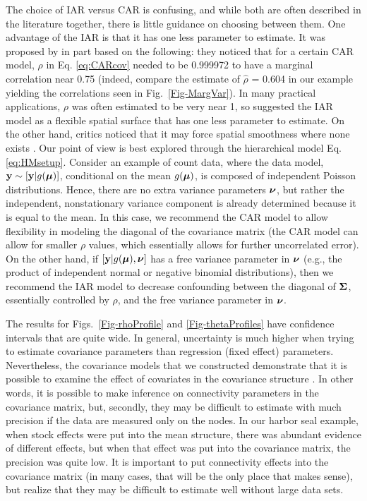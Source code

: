 \documentclass[11pt, titlepage]{article}\usepackage[]{graphicx}\usepackage[]{color}
\begin{document}
\begin{spacing}{1.9}
\begin{flushleft}
The choice of IAR versus CAR is confusing, and while both are often described in the literature together, there is little guidance on choosing between them.  One advantage of the IAR is that it has one less parameter to estimate.  It was proposed by \citet{Besa:Koop:cond:1995} in part based on the following: they noticed that for a certain CAR model, $\rho$ in Eq. \ref{eq:CARcov} needed to be 0.999972 to have a marginal correlation near 0.75 (indeed, compare the estimate of $\hat{\rho}$ = 0.604 in our example yielding the correlations seen in Fig.~\ref{Fig-MargVar}). In many practical applications, $\rho$ was often estimated to be very near 1, so \citet{Besa:Koop:cond:1995} suggested the IAR model as a flexible spatial surface that has one less parameter to estimate.  On the other hand, critics noticed that it may force spatial smoothness where none exists \citep[e.g.,][]{Lero:Lei:Bres:esti:2000}. Our point of view is best explored through the hierarchical model Eq. \ref{eq:HMsetup}.  Consider an example of count data, where the data model, $\mathbf{y} \sim [\mathbf{y}|g(\mbox{\boldmath $\mu$})]$, conditional on the mean $g(\mbox{\boldmath $\mu$})$, is composed of independent Poisson distributions. Hence, there are no extra variance parameters $\mbox{\boldmath $\nu$}$, but rather the independent, nonstationary variance component is already determined because it is equal to the mean. In this case, we recommend the CAR model to allow flexibility in modeling the diagonal of the covariance matrix (the CAR model can allow for smaller $\rho$ values, which essentially allows for further uncorrelated error).  On the other hand, if $[\mathbf{y}|g(\mbox{\boldmath $\mu$}),\mbox{\boldmath $\nu$}]$ has a free variance parameter in $\mbox{\boldmath $\nu$}$ (e.g., the product of independent normal or negative binomial distributions), then we recommend the IAR model to decrease confounding between the diagonal of $\mbox{\boldmath $\Sigma$}$, essentially controlled by $\rho$, and the free variance parameter in $\mbox{\boldmath $\nu$}$.

The results for Figs.~\ref{Fig-rhoProfile} and \ref{Fig-thetaProfiles} have confidence intervals that are quite wide.  In general, uncertainty is much higher when trying to estimate covariance parameters than regression (fixed effect) parameters. Nevertheless, the covariance models that we constructed demonstrate that it is possible to examine the effect of covariates in the covariance structure \citep[see also][]{Hank:Hoot:circ:2013}.  In other words, it is possible to make inference on connectivity parameters in the covariance matrix, but, secondly, they may be difficult to estimate with much precision if the data are measured only on the nodes.  In our harbor seal example, when stock effects were put into the mean structure, there was abundant evidence of different effects, but when that effect was put into the covariance matrix, the precision was quite low.  It is important to put connectivity effects into the covariance matrix (in many cases, that will be the only place that makes sense), but realize that they may be difficult to estimate well without large data sets.


\end{flushleft}
\end{spacing}
\end{document}
